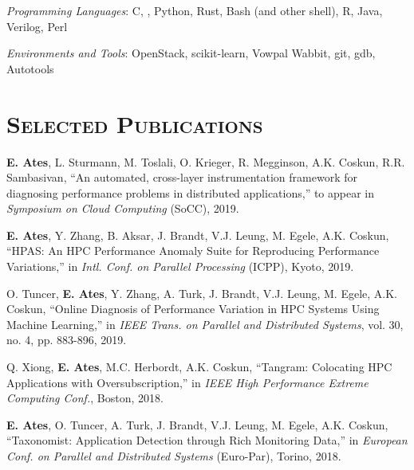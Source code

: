 \begin{resume}
        \emph{Programming Languages}: C, \Cplusplus, Python, Rust, Bash (and
        other shell), R, Java, Verilog, Perl
	\setlength{\parskip}{1mm}

	\emph{Environments and Tools}: OpenStack, scikit-learn, Vowpal Wabbit,
  git, gdb, Autotools




  \section{\textsc{Selected Publications}}
  \textbf{E. Ates}, L. Sturmann, M. Toslali, O. Krieger, R. Megginson, A.K.
  Coskun, R.R. Sambasivan, ``An automated, cross-layer instrumentation framework
  for diagnosing performance problems in distributed applications,'' to appear
  in \textit{Symposium on Cloud Computing} (SoCC), 2019.

  \vspace{0.1in}
  \textbf{E. Ates}, Y. Zhang, B. Aksar, J. Brandt, V.J. Leung, M.
  Egele, A.K. Coskun, ``HPAS: An HPC Performance Anomaly Suite for Reproducing
  Performance Variations,'' in \textit{Intl. Conf. on Parallel Processing}
  (ICPP), Kyoto, 2019.

  \vspace{0.1in}
  O. Tuncer, \textbf{E. Ates}, Y. Zhang, A. Turk, J. Brandt, V.J. Leung, M.
  Egele, A.K. Coskun, ``Online Diagnosis of Performance Variation in HPC Systems
  Using Machine Learning,'' in \textit{IEEE Trans. on Parallel and
    Distributed Systems}, vol. 30, no. 4, pp. 883-896, 2019.

  \vspace{0.1in}

  Q. Xiong, \textbf{E. Ates}, M.C. Herbordt, A.K. Coskun, ``Tangram: Colocating
  HPC Applications with Oversubscription,'' in \textit{IEEE High Performance
    Extreme Computing Conf.}, Boston, 2018.

  \vspace{0.1in}

  \textbf{E. Ates}, O. Tuncer, A. Turk, J. Brandt, V.J. Leung, M. Egele, A.K.
  Coskun, ``Taxonomist: Application Detection through Rich Monitoring Data,'' in
  \textit{European Conf. on Parallel and Distributed Systems} (Euro-Par),
  Torino, 2018.


\end{resume}
